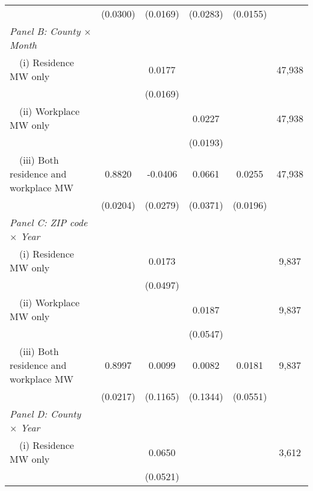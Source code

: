 \begin{landscape}
\begin{table}[ht!]
{\begin{tabular}{@{}lccccc@{}}
                                                             & (0.0300) & (0.0169) & (0.0283) & (0.0155) &      \\
        \textit{Panel B: County $\times$ Month}              &       &       &       &       &      \\
        $\quad$(i) Residence MW only                         &       &  0.0177  &       &       & 47,938 \\
                                                             &       & (0.0169) &       &       &      \\
        $\quad$(ii) Workplace MW only                        &       &       &  0.0227  &       & 47,938 \\
                                                             &       &       & (0.0193) &       &      \\
        $\quad$(iii) Both residence and workplace MW         &  0.8820  &  -0.0406  &  0.0661  &  0.0255  & 47,938 \\
                                                             & (0.0204) & (0.0279) & (0.0371) & (0.0196) &      \\
        \textit{Panel C: ZIP code $\times$ Year}             &       &       &       &       &      \\
        $\quad$(i) Residence MW only                         &       &  0.0173  &       &       & 9,837 \\
                                                             &       & (0.0497) &       &       &      \\
        $\quad$(ii) Workplace MW only                        &       &       &  0.0187  &       & 9,837 \\
                                                             &       &       & (0.0547) &       &      \\
        $\quad$(iii) Both residence and workplace MW         &  0.8997  &  0.0099  &  0.0082  &  0.0181  & 9,837 \\
                                                             & (0.0217) & (0.1165) & (0.1344) & (0.0551) &      \\
         \textit{Panel D: County $\times$ Year}              &       &       &       &       &      \\
        $\quad$(i) Residence MW only                         &       &  0.0650  &       &       & 3,612 \\
                                                             &       & (0.0521) &       &       &      \\

\end{tabular}}
\end{table}
\end{landscape}
